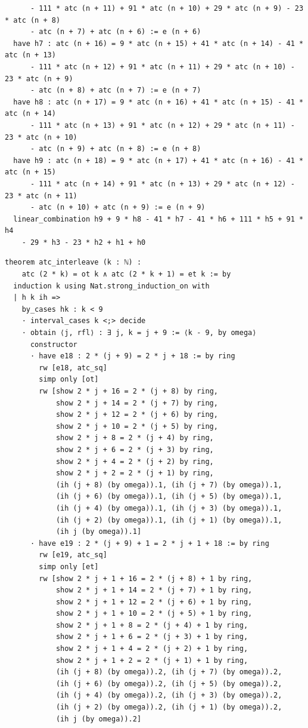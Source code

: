 \documentclass[11pt]{article}
\theoremstyle{definition}
\begin{document}
\begin{lstlisting}
      - 111 * atc (n + 11) + 91 * atc (n + 10) + 29 * atc (n + 9) - 23 * atc (n + 8)
      - atc (n + 7) + atc (n + 6) := e (n + 6)
  have h7 : atc (n + 16) = 9 * atc (n + 15) + 41 * atc (n + 14) - 41 * atc (n + 13)
      - 111 * atc (n + 12) + 91 * atc (n + 11) + 29 * atc (n + 10) - 23 * atc (n + 9)
      - atc (n + 8) + atc (n + 7) := e (n + 7)
  have h8 : atc (n + 17) = 9 * atc (n + 16) + 41 * atc (n + 15) - 41 * atc (n + 14)
      - 111 * atc (n + 13) + 91 * atc (n + 12) + 29 * atc (n + 11) - 23 * atc (n + 10)
      - atc (n + 9) + atc (n + 8) := e (n + 8)
  have h9 : atc (n + 18) = 9 * atc (n + 17) + 41 * atc (n + 16) - 41 * atc (n + 15)
      - 111 * atc (n + 14) + 91 * atc (n + 13) + 29 * atc (n + 12) - 23 * atc (n + 11)
      - atc (n + 10) + atc (n + 9) := e (n + 9)
  linear_combination h9 + 9 * h8 - 41 * h7 - 41 * h6 + 111 * h5 + 91 * h4
    - 29 * h3 - 23 * h2 + h1 + h0
\end{lstlisting}

\begin{lstlisting}[caption={Proof of Theorem~\ref{thm:t1} in full, verbatim
excerpt of the final artifact (lines 155--194, sha256 \texttt{f1aa7099}; line
endings normalized from CRLF).},label={lst:t1proof}]
theorem atc_interleave (k : ℕ) :
    atc (2 * k) = ot k ∧ atc (2 * k + 1) = et k := by
  induction k using Nat.strong_induction_on with
  | h k ih =>
    by_cases hk : k < 9
    · interval_cases k <;> decide
    · obtain ⟨j, rfl⟩ : ∃ j, k = j + 9 := ⟨k - 9, by omega⟩
      constructor
      · have e18 : 2 * (j + 9) = 2 * j + 18 := by ring
        rw [e18, atc_sq]
        simp only [ot]
        rw [show 2 * j + 16 = 2 * (j + 8) by ring,
            show 2 * j + 14 = 2 * (j + 7) by ring,
            show 2 * j + 12 = 2 * (j + 6) by ring,
            show 2 * j + 10 = 2 * (j + 5) by ring,
            show 2 * j + 8 = 2 * (j + 4) by ring,
            show 2 * j + 6 = 2 * (j + 3) by ring,
            show 2 * j + 4 = 2 * (j + 2) by ring,
            show 2 * j + 2 = 2 * (j + 1) by ring,
            (ih (j + 8) (by omega)).1, (ih (j + 7) (by omega)).1,
            (ih (j + 6) (by omega)).1, (ih (j + 5) (by omega)).1,
            (ih (j + 4) (by omega)).1, (ih (j + 3) (by omega)).1,
            (ih (j + 2) (by omega)).1, (ih (j + 1) (by omega)).1,
            (ih j (by omega)).1]
      · have e19 : 2 * (j + 9) + 1 = 2 * j + 1 + 18 := by ring
        rw [e19, atc_sq]
        simp only [et]
        rw [show 2 * j + 1 + 16 = 2 * (j + 8) + 1 by ring,
            show 2 * j + 1 + 14 = 2 * (j + 7) + 1 by ring,
            show 2 * j + 1 + 12 = 2 * (j + 6) + 1 by ring,
            show 2 * j + 1 + 10 = 2 * (j + 5) + 1 by ring,
            show 2 * j + 1 + 8 = 2 * (j + 4) + 1 by ring,
            show 2 * j + 1 + 6 = 2 * (j + 3) + 1 by ring,
            show 2 * j + 1 + 4 = 2 * (j + 2) + 1 by ring,
            show 2 * j + 1 + 2 = 2 * (j + 1) + 1 by ring,
            (ih (j + 8) (by omega)).2, (ih (j + 7) (by omega)).2,
            (ih (j + 6) (by omega)).2, (ih (j + 5) (by omega)).2,
            (ih (j + 4) (by omega)).2, (ih (j + 3) (by omega)).2,
            (ih (j + 2) (by omega)).2, (ih (j + 1) (by omega)).2,
            (ih j (by omega)).2]
\end{lstlisting}
\end{document}
